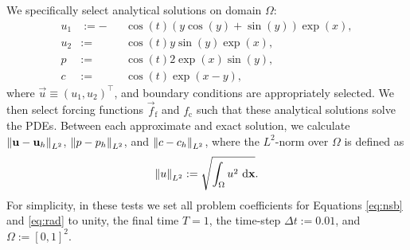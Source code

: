         We specifically select analytical solutions on domain $\Omega$:
        \begin{subequations}
            \begin{alignat}{3}
                u_1 & := - && \cos(t)(y\cos(y) + \sin(y))\exp(x), \label{eq:analytical-solutions:u1}\\
                u_2 & := && \cos(t)y\sin(y)\exp(x), \label{eq:analytical-solutions:u2}\\
                p & := && \cos(t) 2 \exp(x) \sin(y), \label{eq:analytical-solutions:p}\\
                c & := && \cos(t) \exp(x - y), \label{eq:analytical-solutions:c}
            \end{alignat}%
            \label{eq:analytical-solutions}%
        \end{subequations}%
        where $\vec{u} \equiv (u_1, u_2)^\intercal$, and boundary conditions are appropriately selected. We then select forcing functions $\vec{f}_\text{f}$ and $f_\text{c}$ such that these analytical solutions solve the PDEs. Between each approximate and exact solution, we calculate $\norm{\boldsymbol{\mathbf{u}} - \boldsymbol{\mathbf{u}}_h}_{L^2}$, $\norm{p - p_h}_{L^2}$, and $\norm{c - c_h}_{L^2}$, where the $L^2$-norm over $\Omega$ is defined as
        \begin{equation}
            \norm{u}_{L^2} := \sqrt{\int_\Omega u^2 ~\mathrm{d} \boldsymbol{\mathbf{x}}}.
        \end{equation}
        For simplicity, in these tests we set all problem coefficients for Equations \eqref{eq:nsb} and \eqref{eq:rad} to unity, the final time $T = 1$, the time-step $\Delta t := 0.01$, and $\Omega := [0, 1]^2$. 


